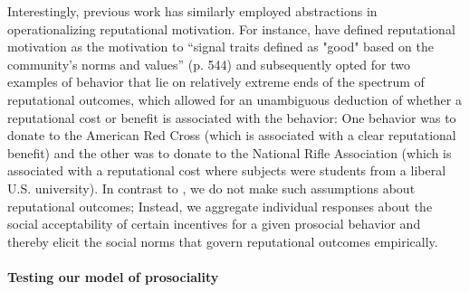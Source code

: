 \documentclass[AER]{AEA}
\begin{document}
Interestingly, previous work has similarly employed abstractions in operationalizing reputational motivation. For instance, \cite{ariely_doing_2009} have defined reputational motivation as the motivation to “signal traits defined as "good" based on the community's norms and values” (p. 544) and subsequently opted for two examples of behavior that lie on relatively extreme ends of the spectrum of reputational outcomes, which allowed for an unambiguous deduction of whether a reputational cost or benefit is associated with the behavior: One behavior was to donate to the American Red Cross (which is associated with a clear reputational benefit) and the other was to donate to the National Rifle Association (which is associated with a reputational cost where subjects were students from a liberal U.S. university). In contrast to \cite{ariely_doing_2009}, we do not make such assumptions about reputational outcomes; Instead, we aggregate individual responses about the social acceptability of certain incentives for a given prosocial behavior and thereby elicit the social norms that govern reputational outcomes empirically. 


\paragraph{Testing our model of prosociality}
\end{document}
